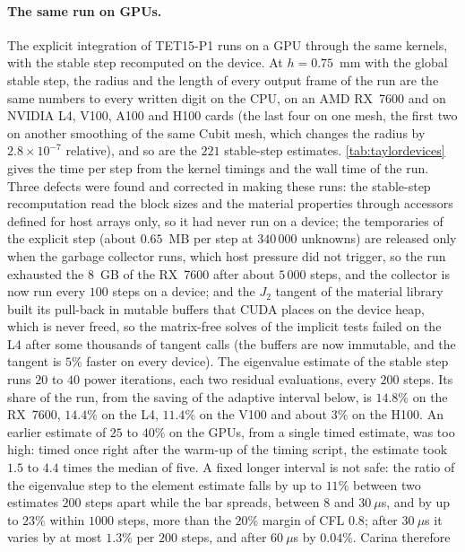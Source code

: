 \documentclass{article}
\theoremstyle{definition}
\theoremstyle{plain}
\begin{document}
\paragraph{The same run on GPUs.} The explicit integration of TET15-P1
runs on a GPU through the same kernels, with the stable step recomputed on
the device. At $h = 0.75$~mm with the global stable step, the radius and the
length of every output frame of the run are the same numbers to every
written digit on the CPU, on an AMD RX~7600 and on NVIDIA L4, V100, A100
and H100 cards (the last four on one mesh, the first two on another smoothing
of the same Cubit mesh, which changes the radius by $2.8\times10^{-7}$
relative),
and so are the $221$ stable-step estimates. \cref{tab:taylordevices}
gives the time per step from the kernel timings and the wall time of the
run. Three defects were found and corrected in making these runs: the
stable-step recomputation read the block sizes and the material properties
through accessors defined for host arrays only, so it had never run on a
device; the temporaries of the explicit step (about $0.65$~MB per step at
$340\,000$ unknowns) are released only when the garbage collector runs,
which host pressure did not trigger, so the run exhausted the $8$~GB of the
RX~7600 after about $5\,000$ steps, and the collector is now run every
$100$ steps on a device; and the $J_2$ tangent of the material library
built its pull-back in mutable buffers that CUDA places on the device heap,
which is never freed, so the matrix-free solves of the implicit tests failed
on the L4 after some thousands of tangent calls (the buffers are now
immutable, and the tangent is $5\%$ faster on every device). The eigenvalue
estimate of the stable step runs $20$ to $40$ power iterations, each two
residual evaluations, every $200$ steps. Its share of the run, from the
saving of the adaptive interval below, is $14.8\%$ on the RX~7600, $14.4\%$
on the L4, $11.4\%$ on the V100 and about $3\%$ on the H100. An earlier
estimate of $25$ to $40\%$ on the GPUs, from a single timed estimate, was
too high: timed once right after the warm-up of the timing script, the
estimate took $1.5$ to $4.4$ times the median of five. A fixed longer interval is not
safe: the ratio of the eigenvalue step to the element estimate falls by up
to $11\%$ between two estimates $200$ steps apart while the bar spreads,
between $8$ and $30~\mu$s, and by up to $23\%$ within $1000$ steps, more
than the $20\%$ margin of CFL $0.8$; after $30~\mu$s it varies by at most
$1.3\%$ per $200$ steps, and after $60~\mu$s by $0.04\%$. Carina therefore
\end{document}
